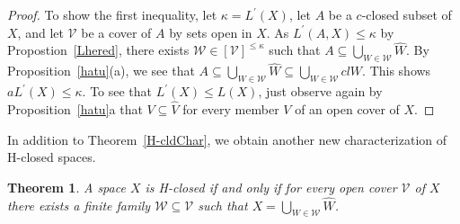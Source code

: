 \documentclass[11pt]{amsart}
\newif\ifdraft\draftfalse
\newtheorem{theorem}{Theorem}[section]
\theoremstyle{definition}
\theoremstyle{remark}
\numberwithin{equation}{section}
\begin{document}
\begin{proof}
To show the first inequality, let $\kappa=L^\prime(X)$, let $A$ be a $c$-closed subset of $X$, and let ${\ensuremath{\mathcal{{V}}}}$ be a cover of $A$ by sets open in $X$. As $L^\prime(A,X)\leq\kappa$ by Propostion~\ref{Lhered}, there exists ${\ensuremath{\mathcal{{W}}}}\in[{\ensuremath{\mathcal{{V}}}}]^{\leq\kappa}$ such that $A{\subseteq}{\bigcup}_{W\in{\ensuremath{\mathcal{{W}}}}}\widehat{W}$. By Proposition~\ref{hatu}(a), we see that $A{\subseteq}{\bigcup}_{W\in{\ensuremath{\mathcal{{W}}}}}\widehat{W}{\subseteq}{\bigcup}_{W\in{\ensuremath{\mathcal{{W}}}}}clW$. This shows $aL^\prime(X)\leq\kappa$. To see that $L^\prime(X)\leq L(X)$, just observe again by Proposition~\ref{hatu}a that $V{\subseteq}\widehat{V}$ for every member $V$ of an open cover of $X$.
\end{proof}
In addition to Theorem~\ref{H-cldChar}, we obtain another new characterization of H-closed spaces.

\begin{theorem}{{\immediate{}}{\ifdraft\hspace{-\lastskip}\vadjust{\vspace{-1mm}\smash{\llap{{\tt {{HclosedChar}}}\hspace{8mm}}}\vspace{1mm}}\fi}}
A space $X$ is H-closed if and only if for every open cover ${\ensuremath{\mathcal{{V}}}}$ of $X$ there exists a finite family ${\ensuremath{\mathcal{{W}}}}{\subseteq}{\ensuremath{\mathcal{{V}}}}$ such that $X={\bigcup}_{W\in{\ensuremath{\mathcal{{W}}}}}\widehat{W}$.
\end{theorem}
\end{document}
